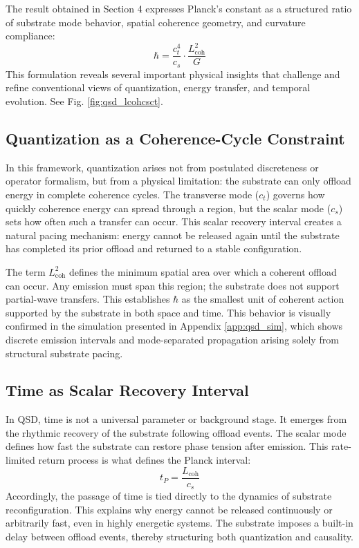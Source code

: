 \documentclass[ht-mathphys]{ht-fmt}
\theoremstyle{thmstyleone}%
\theoremstyle{thmstyletwo}%
\theoremstyle{thmstylethree}%
\begin{document}
The result obtained in Section 4 expresses Planck’s constant as a structured ratio of substrate mode behavior, spatial coherence geometry, and curvature compliance:
\[
\hbar = \frac{c_t^4}{c_s} \cdot \frac{L_{\text{coh}}^2}{G}
\]
This formulation reveals several important physical insights that challenge and refine conventional views of quantization, energy transfer, and temporal evolution. See Fig. \ref{fig:qsd_lcohcsct}.

\subsection{Quantization as a Coherence-Cycle Constraint}

In this framework, quantization arises not from postulated discreteness or operator formalism, but from a physical limitation: the substrate can only offload energy in complete coherence cycles. The transverse mode ($c_t$) governs how quickly coherence energy can spread through a region, but the scalar mode ($c_s$) sets how often such a transfer can occur. This scalar recovery interval creates a natural pacing mechanism: energy cannot be released again until the substrate has completed its prior offload and returned to a stable configuration.

The term $L_{\text{coh}}^2$ defines the minimum spatial area over which a coherent offload can occur. Any emission must span this region; the substrate does not support partial-wave transfers. This establishes $\hbar$ as the smallest unit of coherent action supported by the substrate in both space and time. This behavior is visually confirmed in the simulation presented in Appendix \ref{app:qsd_sim}, which shows discrete emission intervals and mode-separated propagation arising solely from structural substrate pacing.

\subsection{Time as Scalar Recovery Interval}

In QSD, time is not a universal parameter or background stage. It emerges from the rhythmic recovery of the substrate following offload events. The scalar mode defines how fast the substrate can restore phase tension after emission. This rate-limited return process is what defines the Planck interval:
\[
t_P = \frac{L_{\text{coh}}}{c_s}
\]
Accordingly, the passage of time is tied directly to the dynamics of substrate reconfiguration. This explains why energy cannot be released continuously or arbitrarily fast, even in highly energetic systems. The substrate imposes a built-in delay between offload events, thereby structuring both quantization and causality.
\end{document}
